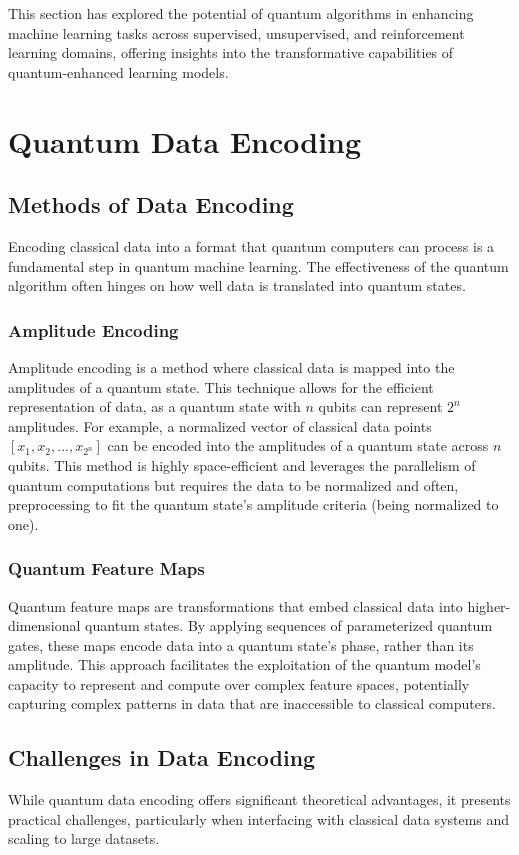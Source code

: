 \documentclass{book}
\begin{document}
This section has explored the potential of quantum algorithms in enhancing machine learning tasks across supervised, unsupervised, and reinforcement learning domains, offering insights into the transformative capabilities of quantum-enhanced learning models.
\section{Quantum Data Encoding}

\subsection{Methods of Data Encoding}
Encoding classical data into a format that quantum computers can process is a fundamental step in quantum machine learning. The effectiveness of the quantum algorithm often hinges on how well data is translated into quantum states.

\subsubsection{Amplitude Encoding}
Amplitude encoding is a method where classical data is mapped into the amplitudes of a quantum state. This technique allows for the efficient representation of data, as a quantum state with \( n \) qubits can represent \( 2^n \) amplitudes. For example, a normalized vector of classical data points \( [x_1, x_2, \dots, x_{2^n}] \) can be encoded into the amplitudes of a quantum state across \( n \) qubits. This method is highly space-efficient and leverages the parallelism of quantum computations but requires the data to be normalized and often, preprocessing to fit the quantum state's amplitude criteria (being normalized to one).

\subsubsection{Quantum Feature Maps}
Quantum feature maps are transformations that embed classical data into higher-dimensional quantum states. By applying sequences of parameterized quantum gates, these maps encode data into a quantum state's phase, rather than its amplitude. This approach facilitates the exploitation of the quantum model's capacity to represent and compute over complex feature spaces, potentially capturing complex patterns in data that are inaccessible to classical computers.

\subsection{Challenges in Data Encoding}
While quantum data encoding offers significant theoretical advantages, it presents practical challenges, particularly when interfacing with classical data systems and scaling to large datasets.
\end{document}
